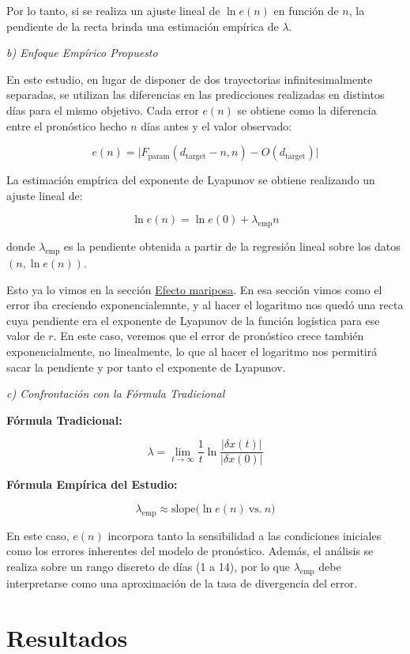 \documentclass[
  11pt,
  a4paper,
  DIV=11,
  numbers=noendperiod]{scrreprt}
\begin{document}
Por lo tanto, si se realiza un ajuste lineal de \(\ln e(n)\) en función
de \(n\), la pendiente de la recta brinda una estimación empírica de
\(\lambda\).

\emph{b) Enfoque Empírico Propuesto}

En este estudio, en lugar de disponer de dos trayectorias
infinitesimalmente separadas, se utilizan las diferencias en las
predicciones realizadas en distintos días para el mismo objetivo. Cada
error \(e(n)\) se obtiene como la diferencia entre el pronóstico hecho
\(n\) días antes y el valor observado:

\[
e(n) = \bigl| F_{\text{param}}(d_{\text{target}}-n, n) - O(d_{\text{target}}) \bigr|
\]

La estimación empírica del exponente de Lyapunov se obtiene realizando
un ajuste lineal de:

\[
\ln e(n) = \ln e(0) + \lambda_{\text{emp}} n
\]

donde \(\lambda_{\text{emp}}\) es la pendiente obtenida a partir de la
regresión lineal sobre los datos \((n, \ln e(n))\).

Esto ya lo vimos en la sección \hyperref[sec-sensibilidad]{Efecto
mariposa}. En esa sección vimos como el error iba creciendo
exponencialemnte, y al hacer el logaritmo nos quedó una recta cuya
pendiente era el exponente de Lyapunov de la función logística para ese
valor de \(r\). En este caso, veremos que el error de pronóstico crece
también exponencialmente, no linealmente, lo que al hacer el logaritmo
nos permitirá sacar la pendiente y por tanto el exponente de Lyapunov.

\emph{c) Confrontación con la Fórmula Tradicional}

\textbf{Fórmula Tradicional:}

\[
\lambda = \lim_{t \to \infty} \frac{1}{t} \ln \frac{|\delta x(t)|}{|\delta x(0)|}
\]

\textbf{Fórmula Empírica del Estudio:}

\[
\lambda_{\text{emp}} \approx \text{slope}\bigl(\ln e(n)\ \text{vs.}\ n\bigr)
\]

En este caso, \(e(n)\) incorpora tanto la sensibilidad a las condiciones
iniciales como los errores inherentes del modelo de pronóstico. Además,
el análisis se realiza sobre un rango discreto de días (1 a 14), por lo
que \(\lambda_{\text{emp}}\) debe interpretarse como una aproximación de
la tasa de divergencia del error.

\section{Resultados}\label{resultados-2}
\end{document}

